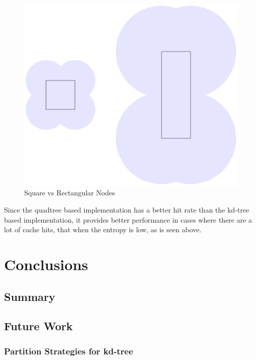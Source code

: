 \documentclass[mcs]{scsthesis}
\begin{document}
\begin{figure}
\begin{center}
\includegraphics[scale=0.5]{diagrams/node_coverage.eps}
\caption{Square vs Rectangular Nodes}
\label{fig:node_coverage}
\end{center}
\end{figure}

Since the quadtree based implementation has a better hit rate than the kd-tree
based implementation, it provides better performance in cases where there are
a lot of cache hits, that when the entropy is low, as is seen above.

\chapter{Conclusions}

\section{Summary}


\section{Future Work}

\subsection{Partition Strategies for kd-tree}
\end{document}
